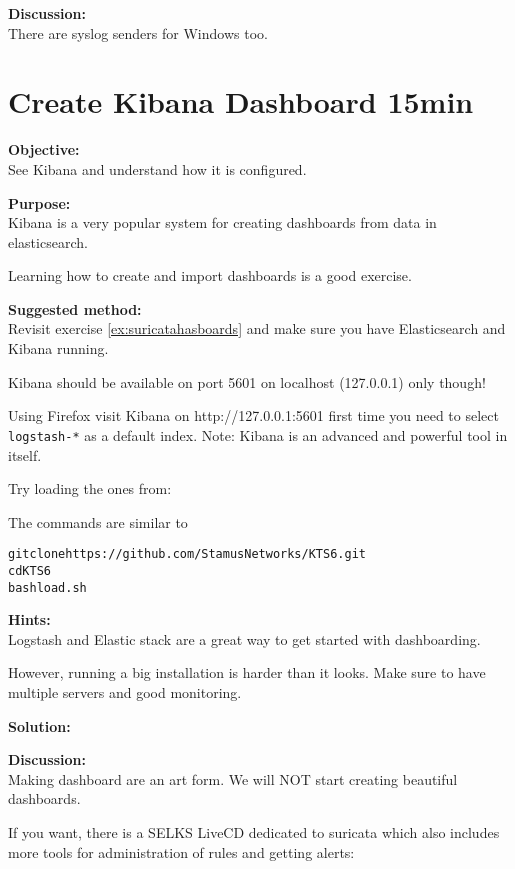 \documentclass[a4paper,11pt,notitlepage]{report}
\begin{document}
{\bf Discussion:}\\
There are syslog senders for Windows too.

\chapter{Create Kibana Dashboard 15min}
\label{ex:kibana-dashboard}

{\bf Objective:}\\
See Kibana and understand how it is configured.

{\bf Purpose:}\\
Kibana is a very popular system for creating dashboards from data in elasticsearch.

Learning how to create and import dashboards is a good exercise.

{\bf Suggested method:}\\
Revisit exercise \ref{ex:suricatahasboards} and make sure you have Elasticsearch and Kibana running.

Kibana should be available on port 5601 on localhost (127.0.0.1) only though!

Using Firefox visit Kibana on http://127.0.0.1:5601 first time you need to
 select \verb+logstash-*+ as a default index. Note: Kibana is an advanced and powerful tool in itself.

Try loading the ones from:

The commands are similar to
\begin{alltt}
git clone https://github.com/StamusNetworks/KTS6.git
cd KTS6
bash load.sh
\end{alltt}

{\bf Hints:}\\
Logstash and Elastic stack are a great way to get started with dashboarding.

However, running a big installation is harder than it looks. Make sure to have multiple servers and good monitoring.

{\bf Solution:}

{\bf Discussion:}\\
Making dashboard are an art form. We will NOT start creating beautiful dashboards.

If you want, there is a SELKS LiveCD dedicated to suricata which also includes more tools for administration of rules and getting alerts:\\
\end{document}
